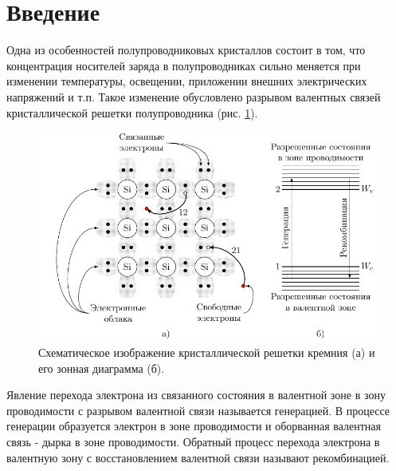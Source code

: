 



\newcommand\Smat{\hat { \mathbf { S } }}
\let\tempint\int
\renewcommand{\int}{\tempint\limits}
\DeclareMathOperator{\Div}{div}
\DeclareMathOperator{\Rot}{rot}
\DeclareMathOperator{\Grad}{grad}
\renewcommand{\phi}{\varphi}



\def\labauthors{Виноградов И.Д., Шиков А.П.}
\def\labgroup{430}
\def\labnumber{3}
\def\labtheme{Измерение dремени жизни и диффузионной длины неосновных носителей заряда в полупроводниках}


\section*{Введение}

Одна из особенностей полупроводниковых кристаллов состоит в том, что концентрация носителей заряда в полупроводниках
сильно меняется при изменении температуры, освещении, приложении внешних электрических напряжений и т.п. Такое изменение
обусловлено разрывом валентных связей кристаллической решетки полупроводника (рис. \ref{fig:figure1}).
\begin{figure}[H]
	\centering
	\includegraphics[]{fig/cryst}
	\caption{Схематическое изображение кристаллической решетки кремния (а) и его зонная диаграмма (б).}
	\label{fig:figure1}
\end{figure}

Явление перехода электрона из связанного состояния в валентной зоне в зону проводимости с разрывом валентной связи
называется генерацией. В процессе генерации образуется электрон в зоне проводимости и оборванная валентная связь - дырка
в зоне проводимости. Обратный процесс перехода электрона в валентную зону с восстановлением валентной связи называют
рекомбинацией.

